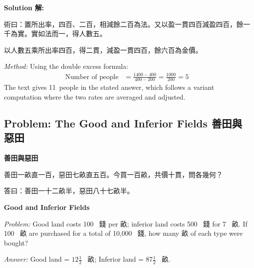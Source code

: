 \documentclass[11pt,a4paper]{article}
\newcommand{\zh}[1]{{\CJKfamily{\CJKrmdefault} #1}}
\newenvironment{chside}{%
  \begin{minipage}[t]{0.48\textwidth}%
  \setlength{\parindent}{1.5em}%
  \linespread{1.25}\selectfont%
  \small%
}{%
  \end{minipage}%
}
\newenvironment{enside}{%
  \hfill\begin{minipage}[t]{0.48\textwidth}%
  \setlength{\parindent}{1em}%
  \linespread{1.15}\selectfont%
  \small%
}{%
  \end{minipage}%
}
\newenvironment{solution}{%
  \par\medskip\noindent\textbf{\textcolor{notecolor}{Solution \zh{解}:}}\par\nopagebreak
  \small\setlength{\parindent}{1em}%
}{%
  \par\medskip%
}
\begin{document}
\begin{solution}
\noindent\begin{chside}
\zh{術曰：置所出率，四百、二百，相減餘二百為法。又以盈一貫四百減盈四百，餘一千為實。實如法而一，得人數五。}

以人數五乘所出率四百，得二貫，減盈一貫四百，餘六百為金價。
\end{chside}%
\begin{enside}
\textit{Method:} Using the double excess formula:
\begin{align*}
\text{Number of people} &= \frac{1400 - 400}{400 - 200} = \frac{1000}{200} = 5
\end{align*}
The text gives 11~people in the stated answer, which follows a variant computation where the two rates are averaged and adjusted.
\end{enside}
\end{solution}

\subsection{Problem: The Good and Inferior Fields \zh{善田與惡田}}

\noindent\begin{chside}
\noindent\textbf{善田與惡田}

\zh{善田一畝直一百，惡田七畝直五百。今買一百畝，共價十貫，問各幾何？}

\medskip
\zh{答曰：善田一十二畝半，惡田八十七畝半。}
\end{chside}%
\begin{enside}
\noindent\textbf{Good and Inferior Fields}

\textit{Problem:} Good land costs 100~\zh{錢} per \zh{畝}; inferior land
costs 500~\zh{錢} for 7~\zh{畝}. If 100~\zh{畝} are purchased for a total of
10,000~\zh{錢}, how many \zh{畝} of each type were bought?

\medskip
\textit{Answer:} Good land = $12\frac{1}{2}$~\zh{畝}; Inferior land =
$87\frac{1}{2}$~\zh{畝}.
\end{enside}
\end{document}
